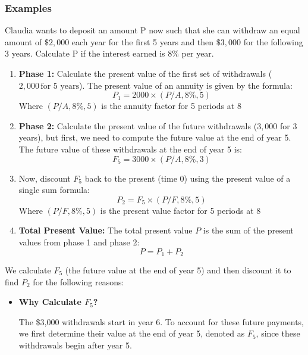     \subsubsection{Examples}
    \begin{example}
        Claudia wants to deposit an amount P now such that she can withdraw an equal amount of $\$2,000$ each year for the first 5 years and then $\$3,000$ for the following 3 years. Calculate P if the interest earned is 8\% per year. 
        \begin{enumerate}
            \item \textbf{Phase 1:} Calculate the present value of the first set of withdrawals ($2,000 \, \text{for 5 years}$). 
            The present value of an annuity is given by the formula:
            \[
            P_1 = 2000 \times (P/A, 8\%, 5)
            \]
            Where $(P/A, 8\%, 5)$ is the annuity factor for 5 periods at 8%
        
            \item \textbf{Phase 2:} Calculate the present value of the future withdrawals ($3,000$ for 3 years), but first, we need to compute the future value at the end of year 5.
            The future value of these withdrawals at the end of year 5 is:
            \[
            F_5 = 3000 \times (P/A, 8\%, 3)
            \]
            
            \item Now, discount \( F_5 \) back to the present (time 0) using the present value of a single sum formula:
            \[
            P_2 = F_5 \times (P/F, 8\%, 5)
            \]
            Where $(P/F, 8\%, 5)$ is the present value factor for 5 periods at 8%
        
            \item \textbf{Total Present Value:} The total present value \( P \) is the sum of the present values from phase 1 and phase 2:
            \[
            P = P_1 + P_2
            \]
        \end{enumerate}

        We calculate $F_5$ (the future value at the end of year 5) and then discount it to find $P_2$ for the following reasons:

        \begin{itemize}
            \item \textbf{Why Calculate $F_5$?} 
            
            The \$3,000 withdrawals start in year 6. To account for these future payments, we first determine their value at the end of year 5, denoted as $F_5$, since these withdrawals begin after year 5.
            

\end{itemize}
\end{example}
